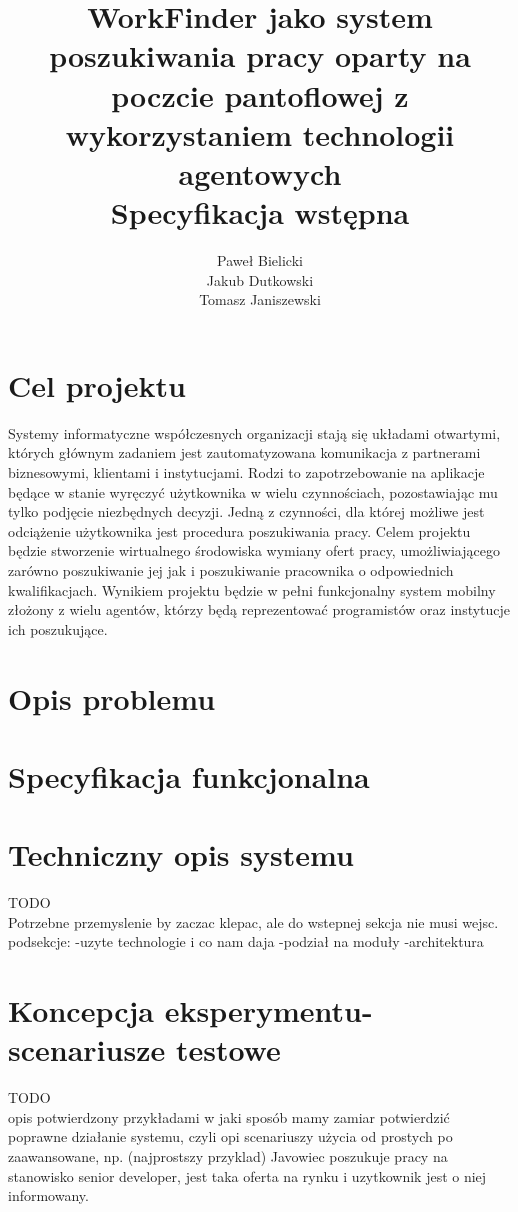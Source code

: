 \documentclass[11pt,a4paper]{article}
\author{
	Paweł Bielicki\\
	Jakub Dutkowski\\
	Tomasz Janiszewski
}
\title{
	\huge{WorkFinder jako system poszukiwania pracy oparty na poczcie pantoflowej z wykorzystaniem technologii agentowych}\\
	\LARGE{Specyfikacja wstępna}
 }
\begin{document}
\maketitle
\newpage

\section{Cel projektu}
Systemy informatyczne współczesnych organizacji stają się układami otwartymi, których głównym zadaniem jest zautomatyzowana komunikacja z partnerami biznesowymi, klientami i instytucjami. Rodzi to zapotrzebowanie na aplikacje będące w stanie wyręczyć użytkownika w wielu czynnościach, pozostawiając mu tylko podjęcie niezbędnych decyzji.
Jedną z czynności, dla której możliwe jest odciążenie użytkownika jest procedura poszukiwania pracy. Celem projektu będzie stworzenie wirtualnego środowiska wymiany ofert pracy, umożliwiającego zarówno poszukiwanie jej jak i poszukiwanie pracownika o odpowiednich kwalifikacjach.
Wynikiem projektu będzie w pełni funkcjonalny system mobilny złożony z wielu agentów, którzy będą reprezentować programistów oraz instytucje ich poszukujące.

\section{Opis problemu}


\section{Specyfikacja funkcjonalna}


\section{Techniczny opis systemu}
TODO\\
Potrzebne przemyslenie by zaczac klepac, ale do wstepnej sekcja nie musi wejsc.
podsekcje:
-uzyte technologie i co nam daja
-podział na moduły
-architektura

\section{Koncepcja eksperymentu- scenariusze testowe}
TODO\\
opis potwierdzony przykładami w jaki sposób mamy zamiar potwierdzić poprawne działanie systemu, czyli opi scenariuszy użycia od prostych po zaawansowane, np. (najprostszy przyklad) Javowiec poszukuje pracy na stanowisko senior developer, jest taka oferta na rynku i uzytkownik jest o niej informowany.
	
\end{document}
